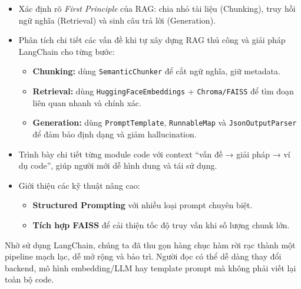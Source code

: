 \documentclass[11pt]{article}
\begin{document}
\begin{itemize}
	\item Xác định rõ \textit{First Principle} của RAG: chia nhỏ tài liệu (Chunking), truy hồi ngữ nghĩa (Retrieval) và sinh câu trả lời (Generation).
	\item Phân tích chi tiết các vấn đề khi tự xây dựng RAG thủ công và giải pháp LangChain cho từng bước:

	\begin{itemize}
		\item \textbf{Chunking:} dùng \texttt{SemanticChunker} để cắt ngữ nghĩa, giữ metadata.
		\item \textbf{Retrieval:} dùng \texttt{HuggingFaceEmbeddings} + \texttt{Chroma/FAISS} để tìm đoạn liên quan nhanh và chính xác.
		\item \textbf{Generation:} dùng \texttt{PromptTemplate}, \texttt{RunnableMap} và \texttt{JsonOutputParser} để đảm bảo định dạng và giảm hallucination.
	\end{itemize}

	\item Trình bày chi tiết từng module code với context “vấn đề → giải pháp → ví dụ code”, giúp người mới dễ hình dung và tái sử dụng.
	\item Giới thiệu các kỹ thuật nâng cao:
	\begin{itemize}
		\item \textbf{Structured Prompting} với nhiều loại prompt chuyên biệt.
		\item \textbf{Tích hợp FAISS} để cải thiện tốc độ truy vấn khi số lượng chunk lớn.
	\end{itemize}
\end{itemize}

Nhờ sử dụng LangChain, chúng ta đã thu gọn hàng chục hàm rời rạc thành một pipeline mạch lạc, dễ mở rộng và bảo trì. Người đọc có thể dễ dàng thay đổi backend, mô hình embedding/LLM hay template prompt mà không phải viết lại toàn bộ code.

\clearpage
\appendix
\end{document}

